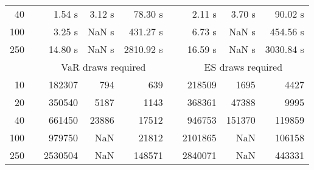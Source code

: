 {{\begin{longtable}{rr rrr r rrr}
40 & & 1.54 s & 3.12 s & 78.30 s && 2.11 s & 3.70 s & 90.02 s \\ 
100 & & 3.25 s &  NaN s & 431.27 s && 6.73 s &  NaN s & 454.56 s \\ 
250 & & 14.80 s &  NaN s & 2810.92 s && 16.59 s &  NaN s & 3030.84 s \\ 
\hline 
 && \multicolumn{3}{c}{VaR draws required} &&   \multicolumn{3}{c}{ES draws required} \\  \cline{3-5}  \cline{7-9} 
10 & & 182307 & 794 & 639 && 218509 & 1695 & 4427 \\ 
20 & & 350540 & 5187 & 1143 && 368361 & 47388 & 9995 \\ 
40 & & 661450 & 23886 & 17512 && 946753 & 151370 & 119859 \\ 
100 & & 979750 & NaN & 21812 && 2101865 & NaN & 106158 \\ 
250 & & 2530504 & NaN & 148571 && 2840071 & NaN & 443331 \\ 
\hline 
\end{longtable} 
} 
} 
